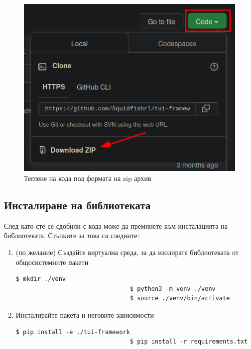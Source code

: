                 \begin{figure}[h]
                        \centering
                        \includegraphics[width=\textwidth]{images/download-zip.png}
                        \caption{Теглене на кода под формата на zip архив}
                        \label{fig:download-zip}
                \end{figure}

        \subsection{Инсталиране на библиотеката}

        След като сте се сдобили с кода може да преминете към инсталацията на 
        библиотеката. Стъпките за това са следните:

        \begin{enumerate}

                \item (по желание) Създайте виртуална среда, за да изолирате
                        библиотеката от общосистемните пакети 
                        \begin{lstlisting}[style=shell]
                                $ mkdir ./venv
                                $ python3 -m venv ./venv
                                $ source ./venv/bin/activate
                        \end{lstlisting}

                \item Инсталирайте пакета и неговите зависимости
                        \begin{lstlisting}[style=shell]
                                $ pip install -e ./tui-framework
                                $ pip install -r requirements.txt
                        \end{lstlisting}

        \end{enumerate}

